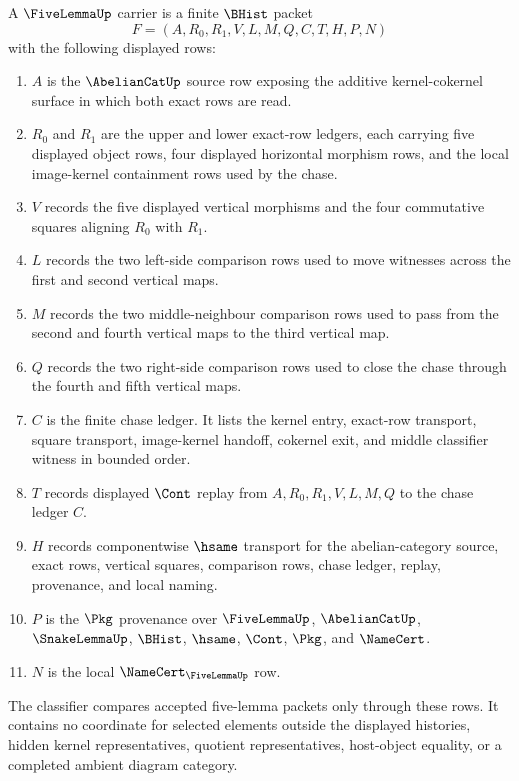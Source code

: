 \begin{definition}
\label{def:five-lemma-carrier}
A $\FiveLemmaUp$ carrier is a finite $\BHist$ packet
$$
F=(A,R_0,R_1,V,L,M,Q,C,T,H,P,N)
$$
with the following displayed rows:
\begin{enumerate}
\item $A$ is the $\AbelianCatUp$ source row exposing the additive
kernel-cokernel surface in which both exact rows are read.
\item $R_0$ and $R_1$ are the upper and lower exact-row ledgers, each carrying
five displayed object rows, four displayed horizontal morphism rows, and the
local image-kernel containment rows used by the chase.
\item $V$ records the five displayed vertical morphisms and the four
commutative squares aligning $R_0$ with $R_1$.
\item $L$ records the two left-side comparison rows used to move witnesses
across the first and second vertical maps.
\item $M$ records the two middle-neighbour comparison rows used to pass from
the second and fourth vertical maps to the third vertical map.
\item $Q$ records the two right-side comparison rows used to close the chase
through the fourth and fifth vertical maps.
\item $C$ is the finite chase ledger. It lists the kernel entry, exact-row
transport, square transport, image-kernel handoff, cokernel exit, and middle
classifier witness in bounded order.
\item $T$ records displayed $\Cont$ replay from $A,R_0,R_1,V,L,M,Q$ to the
chase ledger $C$.
\item $H$ records componentwise $\hsame$ transport for the abelian-category
source, exact rows, vertical squares, comparison rows, chase ledger, replay,
provenance, and local naming.
\item $P$ is the $\Pkg$ provenance over $\FiveLemmaUp$, $\AbelianCatUp$,
$\SnakeLemmaUp$, $\BHist$, $\hsame$, $\Cont$, $\Pkg$, and $\NameCert$.
\item $N$ is the local $\NameCert_{\FiveLemmaUp}$ row.
\end{enumerate}
The classifier compares accepted five-lemma packets only through these rows. It
contains no coordinate for selected elements outside the displayed histories,
hidden kernel representatives, quotient representatives, host-object equality,
or a completed ambient diagram category.
\end{definition}

